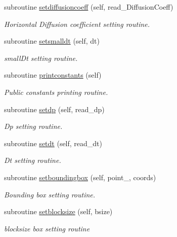 \begin{DoxyCompactItemize}
subroutine \mbox{\hyperlink{namespacesimulationglobals__mod_a70465a87d621a450f8b100fad0d29bc9}{setdiffusioncoeff}} (self, read\+\_\+\+Diffusion\+Coeff)
\begin{DoxyCompactList}\small\item\em Horizontal Diffusion coefficient setting routine. \end{DoxyCompactList}\item 
subroutine \mbox{\hyperlink{namespacesimulationglobals__mod_ad36c21a592a3230ce848804075abc97e}{setsmalldt}} (self, dt)
\begin{DoxyCompactList}\small\item\em small\+Dt setting routine. \end{DoxyCompactList}\item 
subroutine \mbox{\hyperlink{namespacesimulationglobals__mod_a139cb36f8366e6aec875c7977235fd68}{printconstants}} (self)
\begin{DoxyCompactList}\small\item\em Public constants printing routine. \end{DoxyCompactList}\item 
subroutine \mbox{\hyperlink{namespacesimulationglobals__mod_afda1e73e6e0cd075875c70aded99d425}{setdp}} (self, read\+\_\+dp)
\begin{DoxyCompactList}\small\item\em Dp setting routine. \end{DoxyCompactList}\item 
subroutine \mbox{\hyperlink{namespacesimulationglobals__mod_a0eced3f4367d08f3d0cb6ef2044bdc56}{setdt}} (self, read\+\_\+dt)
\begin{DoxyCompactList}\small\item\em Dt setting routine. \end{DoxyCompactList}\item 
subroutine \mbox{\hyperlink{namespacesimulationglobals__mod_abf5afcc12763caab3a5fc394255ced44}{setboundingbox}} (self, point\+\_\+, coords)
\begin{DoxyCompactList}\small\item\em Bounding box setting routine. \end{DoxyCompactList}\item 
subroutine \mbox{\hyperlink{namespacesimulationglobals__mod_af0bc0b00ee3aa2ba9e47dc50daa72799}{setblocksize}} (self, bsize)
\begin{DoxyCompactList}\small\item\em blocksize box setting routine \end{DoxyCompactList}\item 

\end{DoxyCompactItemize}
